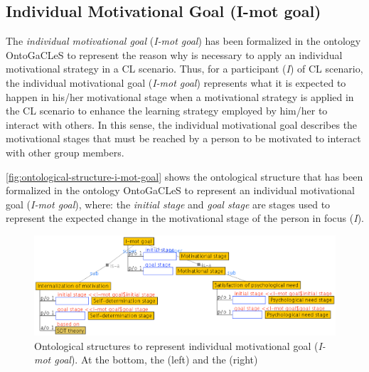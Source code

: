 \subsection{Individual Motivational Goal (I-mot goal)}
\label{subsec:individual-motivational-goal}

The \emph{individual motivational goal} (\emph{I-mot goal}) has been formalized in the ontology OntoGaCLeS to represent the reason why is necessary to apply an individual motivational strategy in a CL scenario. Thus, for a participant (\emph{I}) of CL scenario, the individual motivational goal (\emph{I-mot goal}) represents what it is expected to happen in his/her motivational stage when a motivational strategy is applied in the CL scenario to enhance the learning strategy employed by him/her to interact with others. In this sense, the individual motivational goal describes the motivational stages that must be reached by a person to be motivated to interact with other group members.

\autoref{fig:ontological-structure-i-mot-goal} shows the ontological structure that has been formalized in the ontology OntoGaCLeS to represent an individual motivational goal (\emph{I-mot goal}), where: the \emph{initial stage} and \emph{goal stage} are stages used to represent the expected change in the motivational stage of the person in focus (\emph{I}).

\begin{figure}[htb]
 \caption{Ontological structures to represent individual motivational goal (\emph{I-mot goal}). At the bottom, the  (left) and the  (right)}
 \label{fig:ontological-structure-i-mot-goal}
 \centering
 \includegraphics[width=1\textwidth]{images/chap-ontogacles1/ontological-structure-i-mot-goal.png}
 \fautor
\end{figure}

